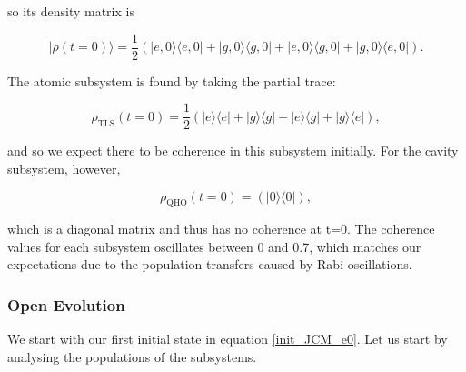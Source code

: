 \documentclass[11pt]{article}
\begin{document}
so its density matrix is

\begin{equation*}
    |\rho(t=0)\rangle = \frac{1}{2}\left(|e,0\rangle\langle e,0| + |g,0\rangle\langle g,0| + |e,0\rangle\langle g,0| + |g,0\rangle\langle e,0| \right).
\end{equation*}

The atomic subsystem is found by taking the partial trace:

\begin{equation*}
    \rho_{\scriptscriptstyle \text{TLS}}(t = 0) = \frac{1}{2}\left(|e\rangle\langle e|+ |g\rangle\langle g|+|e\rangle\langle g|+|g\rangle\langle e|\right),
\end{equation*}

and so we expect there to be coherence in this subsystem initially. For the cavity subsystem, however, 

\begin{equation*}
    \rho_{\scriptscriptstyle \text{QHO}}(t = 0) = \left(|0\rangle\langle 0|\right),
\end{equation*}

which is a diagonal matrix and thus has no coherence at t=0. The coherence values for each subsystem oscillates between 0 and 0.7, which matches our expectations due to the population transfers caused by Rabi oscillations. 




\newpage
\subsubsection{Open Evolution}

We start with our first initial state in equation \eqref{init_JCM_e0}. Let us start by analysing the populations of the subsystems. 
\end{document}
